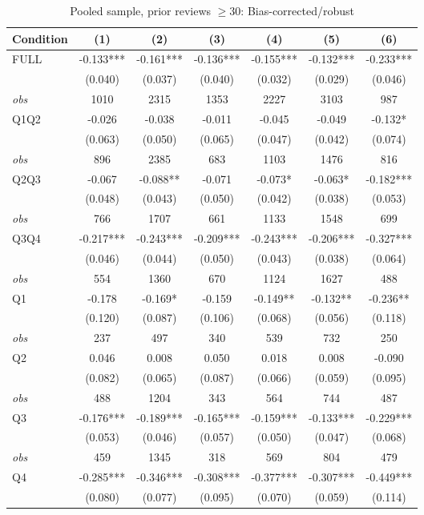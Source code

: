 \begin{table}[!htbp]
\centering
\caption{Pooled sample, prior reviews $\geq30$: Bias-corrected/robust}
\begin{tabular}{lcccccc}
\toprule
Condition & (1) & (2) & (3) & (4) & (5) & (6) \\
\midrule
FULL & -0.133*** & -0.161*** & -0.136*** & -0.155*** & -0.132*** & -0.233*** \\
 & (0.040) & (0.037) & (0.040) & (0.032) & (0.029) & (0.046) \\
\textit{obs} & 1010 & 2315 & 1353 & 2227 & 3103 & 987 \\
Q1Q2 & -0.026 & -0.038 & -0.011 & -0.045 & -0.049 & -0.132* \\
 & (0.063) & (0.050) & (0.065) & (0.047) & (0.042) & (0.074) \\
\textit{obs} & 896 & 2385 & 683 & 1103 & 1476 & 816 \\
Q2Q3 & -0.067 & -0.088** & -0.071 & -0.073* & -0.063* & -0.182*** \\
 & (0.048) & (0.043) & (0.050) & (0.042) & (0.038) & (0.053) \\
\textit{obs} & 766 & 1707 & 661 & 1133 & 1548 & 699 \\
Q3Q4 & -0.217*** & -0.243*** & -0.209*** & -0.243*** & -0.206*** & -0.327*** \\
 & (0.046) & (0.044) & (0.050) & (0.043) & (0.038) & (0.064) \\
\textit{obs} & 554 & 1360 & 670 & 1124 & 1627 & 488 \\
Q1 & -0.178 & -0.169* & -0.159 & -0.149** & -0.132** & -0.236** \\
 & (0.120) & (0.087) & (0.106) & (0.068) & (0.056) & (0.118) \\
\textit{obs} & 237 & 497 & 340 & 539 & 732 & 250 \\
Q2 & 0.046 & 0.008 & 0.050 & 0.018 & 0.008 & -0.090 \\
 & (0.082) & (0.065) & (0.087) & (0.066) & (0.059) & (0.095) \\
\textit{obs} & 488 & 1204 & 343 & 564 & 744 & 487 \\
Q3 & -0.176*** & -0.189*** & -0.165*** & -0.159*** & -0.133*** & -0.229*** \\
 & (0.053) & (0.046) & (0.057) & (0.050) & (0.047) & (0.068) \\
\textit{obs} & 459 & 1345 & 318 & 569 & 804 & 479 \\
Q4 & -0.285*** & -0.346*** & -0.308*** & -0.377*** & -0.307*** & -0.449*** \\
 & (0.080) & (0.077) & (0.095) & (0.070) & (0.059) & (0.114) \\

\end{tabular}
\end{table}
